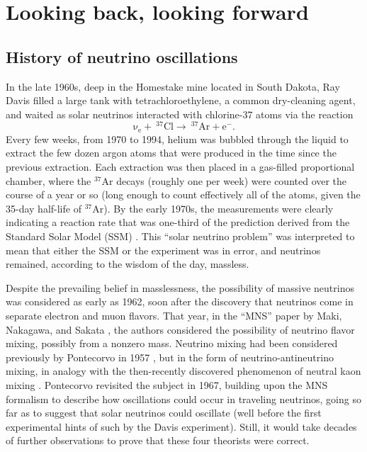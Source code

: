 \documentclass[../thesis.tex]{subfiles}
\begin{document}
\chapter{Looking back, looking forward}%
\label{chap:pastAndFuture}

\section{History of neutrino oscillations}
\label{sec:history}

In the late 1960s, deep in the Homestake mine located in South Dakota, Ray Davis filled a large tank with tetrachloroethylene, a common dry-cleaning agent, and waited as solar neutrinos interacted with chlorine-37 atoms via the reaction
\begin{equation}
  \mathrm{\nu_e + \ ^{37}Cl \longrightarrow \ ^{37}Ar + e^-.}  
\end{equation}
Every few weeks, from 1970 to 1994, helium was bubbled through the liquid to extract the few dozen argon atoms that were produced in the time since the previous extraction. Each extraction was then placed in a gas-filled proportional chamber, where the $^{37}$Ar decays (roughly one per week) were counted over the course of a year or so (long enough to count effectively all of the atoms, given the 35-day half-life of $^{37}$Ar). By the early 1970s, the measurements were clearly indicating a reaction rate that was one-third of the prediction derived from the Standard Solar Model (SSM) \cite{DAVIS199413}. This ``solar neutrino problem'' was interpreted to mean that either the SSM or the experiment was in error, and neutrinos remained, according to the wisdom of the day, massless.

Despite the prevailing belief in masslessness, the possibility of massive neutrinos was considered as early as 1962, soon after the discovery that neutrinos come in separate electron and muon flavors. That year, in the ``MNS'' paper by Maki, Nakagawa, and Sakata \cite{10.1143/PTP.28.870}, the authors considered the possibility of neutrino flavor mixing, possibly from a nonzero mass. Neutrino mixing had been considered previously by Pontecorvo in 1957 \cite{Pontecorvo:1957cp}, but in the form of neutrino-antineutrino mixing, in analogy with the then-recently discovered phenomenon of neutral kaon mixing \cite{PhysRev.105.1925.2}. Pontecorvo revisited the subject in 1967, building upon the MNS formalism to describe how oscillations could occur in traveling neutrinos, going so far as to suggest that solar neutrinos could oscillate (well before the first experimental hints of such by the Davis experiment). Still, it would take decades of further observations to prove that these four theorists were correct.
\end{document}
